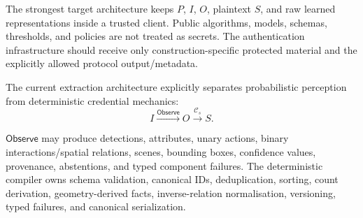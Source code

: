 \documentclass[11pt,a4paper]{article}
\begin{document}
\begin{center}
\end{center}

The strongest target architecture keeps $P$, $I$, $O$, plaintext $S$, and raw learned representations inside a trusted client. Public algorithms, models, schemas, thresholds, and policies are not treated as secrets. The authentication infrastructure should receive only construction-specific protected material and the explicitly allowed protocol output/metadata.

The current extraction architecture explicitly separates probabilistic perception from deterministic credential mechanics:
\begin{equation}
  I \xrightarrow{\mathsf{Observe}} O \xrightarrow{\mathcal{C}_s} S.
\end{equation}

$\mathsf{Observe}$ may produce detections, attributes, unary actions, binary interactions/spatial relations, scenes, bounding boxes, confidence values, provenance, abstentions, and typed component failures. The deterministic compiler owns schema validation, canonical IDs, deduplication, sorting, count derivation, geometry-derived facts, inverse-relation normalisation, versioning, typed failures, and canonical serialization.
\end{document}
